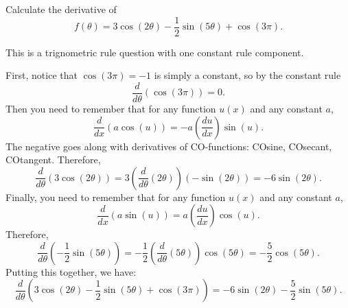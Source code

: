 \documentclass{ximera}
\author{Emma Smith Zbarsky}
\begin{document}
\begin{exercise}

Calculate the derivative of
\[f(\theta) = 3\cos(2\theta)-\frac{1}{2}\sin(5\theta)+\cos(3\pi).\]


\begin{hint}
This is a trignometric rule question with one constant rule component.
\end{hint}


\begin{hint}
First, notice that $\cos(3\pi) = -1$ is simply a constant, so by the
constant rule \[\frac{d}{d\theta}\left(\cos(3\pi)\right) = 0.\] Then you
need to remember that for any function $u(x)$ and any constant $a$,
\[\frac{d}{dx}\left(a\cos(u)\right) = -a\left(\frac{du}{dx}\right)\sin(u).\]
The negative goes along with derivatives of CO-functions: COsine,
COsecant, COtangent. Therefore,
\[\frac{d}{d\theta}\left(3\cos(2\theta)\right) = 3\left(\frac{d}{d\theta}\left(2\theta\right)\right)\left(-\sin(2\theta)\right) = -6\sin(2\theta).\]
Finally, you need to remember that for any function $u(x)$ and any
constant $a$,
\[\frac{d}{dx}\left(a\sin(u)\right) = a\left(\frac{du}{dx}\right)\cos(u).\]
Therefore,
\[\frac{d}{d\theta}\left(-\frac{1}{2}\sin(5\theta)\right) = -\frac{1}{2}\left(\frac{d}{d\theta}\left(5\theta\right)\right)\cos(5\theta) = -\frac{5}{2}\cos(5\theta).\]
Putting this together, we have:
\[\frac{d}{d\theta}\left(3\cos(2\theta)-\frac{1}{2}\sin(5\theta)+\cos(3\pi)\right) = -6\sin(2\theta)-\frac{5}{2}\sin(5\theta).\]
\end{hint}


\begin{multipleChoice}
\end{multipleChoice}

\end{exercise}
\end{document}
